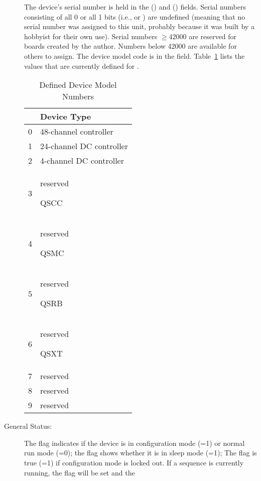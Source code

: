 \documentclass[letterpaper,twoside,onecolumn,openright,final]{memoir}
\begin{document}
\begin{description}
		The device's serial number is held in the  () and 
		 () fields.
		Serial numbers consisting of all 0 or all 1 bits (i.e.,  or )
		are undefined (meaning that no serial number was assigned to this unit, probably 
		because it was built by a hobbyist for their own use).  Serial numbers $\ge42000$
		are reserved for boards created by the author.  Numbers below 42000 are available
		for others to assign.
		The device model
		code is in the  field.  Table~\ref{tbl:modelnumbers} lists the values that are currently defined
		for . 
		\begin{table}
		\begin{center}
		 \begin{tabular}{cl}\toprule
		  \bfseries \Var*{model} & \bfseries Device Type \\\midrule
		  0 & 48-channel controller \\
		  1 & 24-channel DC controller \\
		  2 & 4-channel DC controller \\
		  3 & reserved \begin{QS*}QSCC\end{QS*} \\
		  4 & reserved \begin{QS*}QSMC\end{QS*} \\
		  5 & reserved \begin{QS*}QSRB\end{QS*}\\
		  6 & reserved \begin{QS*}QSXT\end{QS*}\\
		  7 & reserved\\
		  8 & reserved\\
		  9 & reserved\\
		  \bottomrule
		 \end{tabular}
		\caption{Defined Device Model Numbers\label{tbl:modelnumbers}}
		\end{center}
		\end{table}
	\item[General Status:]
		The  flag indicates if the device is in configuration mode (=1)
		or normal run mode (=0); the  flag shows whether it is in sleep
		mode (=1); The  flag is true (=1) if configuration mode is
		locked out.  If a sequence is currently running, the  flag will be set and the

\end{description}
\end{document}

